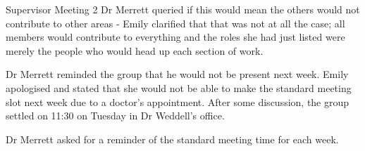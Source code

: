 \documentclass{article}
\begin{document}
\begin{Minutes}{Supervisor Meeting 2}
Dr Merrett queried if this would mean the others would not contribute to other areas - Emily
clarified that that was not at all the case; all members would contribute to everything and
the roles she had just listed were merely the people who would head up each section of work.

Dr Merrett reminded the group that he would not be present next week. Emily apologised and
stated that she would not be able to make the standard meeting slot next week due to a
doctor's appointment. After some discussion, the group settled on 11:30 on Tuesday in
Dr Weddell's office.

Dr Merrett asked for a reminder of the standard meeting time for each week.


\end{Minutes}
\end{document}
